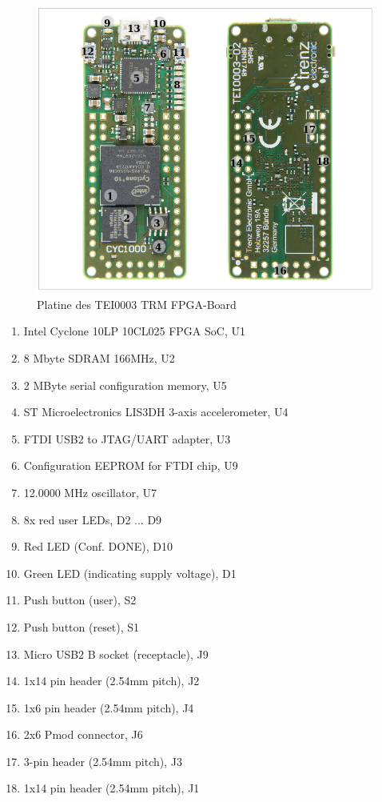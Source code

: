             \begin{figure}[H]
                \centering
                \includegraphics[scale=0.5]{img/fpga_board_layout.png}
                \caption[Platine des TEI0003 TRM FPGA-Board]{Platine des TEI0003 TRM FPGA-Board \cite{terz} }
                \label{fig:fpga_layout}
            \end{figure}

            \begin{enumerate}
                \item Intel Cyclone 10LP 10CL025 FPGA SoC, U1
                \item 8 Mbyte SDRAM 166MHz, U2
                \item 2 MByte serial configuration memory, U5
                \item ST Microelectronics LIS3DH 3-axis accelerometer, U4
                \item FTDI USB2 to JTAG/UART adapter, U3
                \item Configuration EEPROM for FTDI chip, U9
                \item 12.0000 MHz oscillator, U7
                \item 8x red user LEDs, D2 ... D9
                \item Red LED (Conf. DONE), D10
                \item Green LED (indicating supply voltage), D1
                \item Push button (user), S2
                \item Push button (reset), S1
                \item Micro USB2 B socket (receptacle), J9
                \item 1x14 pin header (2.54mm pitch), J2
                \item 1x6 pin header (2.54mm pitch), J4
                \item 2x6 Pmod connector, J6
                \item 3-pin header (2.54mm pitch), J3
                \item 1x14 pin header (2.54mm pitch), J1
            \end{enumerate}



